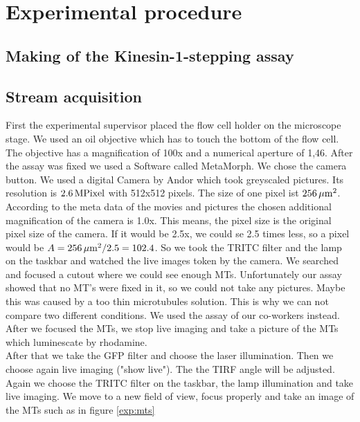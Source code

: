 \section{Experimental procedure}
\subsection{Making of the Kinesin-1-stepping assay}

\subsection{Stream acquisition}
        First the experimental supervisor placed the flow cell holder on the microscope stage. We used an oil objective which has to touch the bottom of the flow cell. The objective has a magnification of 100x and a numerical aperture of 1,46.  
        After the assay was fixed we used a Software called MetaMorph. We chose the camera button. We used a digital Camera by Andor which took greyscaled pictures. Its resolution is $\unit[2.6]{MPixel}$ with 512x512 pixels. The size of one pixel ist $\unit[256]{\mu m^2}$.
        According to the meta data of the movies and pictures the chosen additional magnification of the camera is 1.0x. This means, the pixel size is the original pixel size of the camera. If it would be 2.5x, we could se 2.5 times less, so a pixel would be $A = \unit[256]{\mu m^2} / 2.5 = 102.4$. 
        So we took the TRITC filter and the lamp on the taskbar and watched the live images token by the camera. We searched and focused a cutout where we could see enough MTs. 
        Unfortunately our assay showed that no MT's were fixed in it, so we could not take any pictures. Maybe this was caused by a too thin microtubules solution. This is why we can not compare two different conditions. We used the assay of our co-workers instead. 
        After we focused the MTs, we stop live imaging and take a picture of the MTs which luminescate by rhodamine. \\
        After that we take the GFP filter and choose the laser illumination. Then we choose again live imaging ("show live"). The the TIRF angle will be adjusted.  %
        Again we choose the TRITC filter on the taskbar, the lamp illumination and take live imaging. We move to a new field of view, focus properly and take an image of the MTs such as in figure \ref{exp:mts}\\
